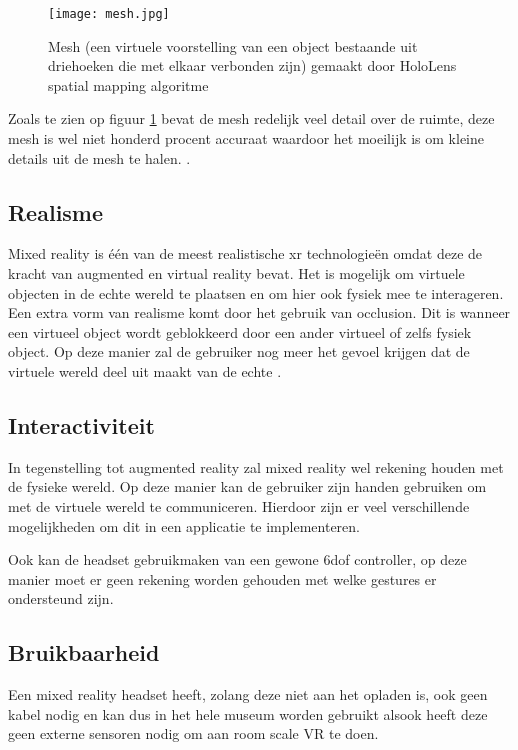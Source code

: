 \begin{figure}
    \texttt{[image: mesh.jpg]}
    \caption{Mesh (een virtuele voorstelling van een object bestaande uit driehoeken die met elkaar verbonden zijn) gemaakt door HoloLens spatial mapping algoritme \autocite{MicrosoftSpatial}}
    \label{fig:mesh}
\end{figure}

Zoals te zien op figuur \ref{fig:mesh} bevat de mesh redelijk veel detail over de ruimte, deze mesh is wel niet honderd procent accuraat waardoor het moeilijk is om kleine details uit de mesh te halen. \autocite{Evans2017}.

\subsection{Realisme}
Mixed reality is één van de meest realistische \acrshort{xr} technologieën omdat deze de kracht van augmented en virtual reality bevat. Het is mogelijk om virtuele objecten in de echte wereld te plaatsen en om hier ook fysiek mee te interageren. Een extra vorm van realisme komt door het gebruik van occlusion. Dit is wanneer een virtueel object wordt geblokkeerd door een ander virtueel of zelfs fysiek object. Op deze manier zal de gebruiker nog meer het gevoel krijgen dat de virtuele wereld deel uit maakt van de echte \autocite{Evans2017}.

\subsection{Interactiviteit}
In tegenstelling tot augmented reality zal mixed reality wel rekening houden met de fysieke wereld. Op deze manier kan de gebruiker zijn handen gebruiken om met de virtuele wereld te communiceren. Hierdoor zijn er veel verschillende mogelijkheden om dit in een applicatie te implementeren.

Ook kan de headset gebruikmaken van een gewone \acrshort{6dof} controller, op deze manier moet er geen rekening worden gehouden met welke gestures er ondersteund zijn.

\subsection{Bruikbaarheid}
Een mixed reality headset heeft, zolang deze niet aan het opladen is, ook geen kabel nodig en kan dus in het hele museum worden gebruikt alsook heeft deze geen externe sensoren nodig om aan room scale VR te doen. 


